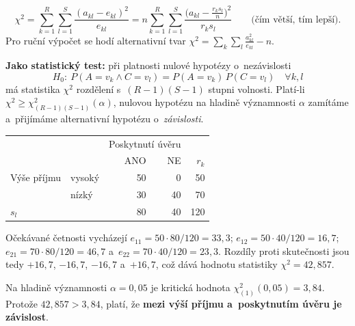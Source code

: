 \documentclass[11pt,a4paper]{article}
\theoremstyle{definition}
\begin{document}
\begin{defbox}
\[ \chi^2=\sum_{k=1}^{R}\sum_{l=1}^{S}\frac{(a_{kl}-e_{kl})^2}{e_{kl}}
   = n\sum_{k=1}^{R}\sum_{l=1}^{S}\frac{\big(a_{kl}-\tfrac{r_ks_l}{n}\big)^2}{r_ks_l}
   \qquad\text{(čím větší, tím lepší).}\]
Pro ruční výpočet se hodí alternativní tvar $\chi^2=\sum_k\sum_l \frac{a_{kl}^2}{e_{kl}}-n$.

\textbf{Jako statistický test:} při platnosti nulové hypotézy o~nezávislosti
\[ H_0:\ P(A=v_k\wedge C=v_l)=P(A=v_k)\,P(C=v_l)\quad \forall k,l \]
má statistika $\chi^2$ rozdělení s~$(R-1)(S-1)$ stupni volnosti. Platí-li
$\chi^2\ge\chi^2_{(R-1)(S-1)}(\alpha)$, nulovou hypotézu na hladině významnosti $\alpha$
zamítáme a~přijímáme alternativní hypotézu o~\emph{závislosti}.
\end{defbox}

\begin{defbox}
\begin{center}
\begin{tabular}{@{}llrrr@{}}
\toprule
& & \multicolumn{2}{c}{Poskytnutí úvěru} & \\
& & ANO & NE & $r_k$ \\
\midrule
Výše příjmu & vysoký & 50 & 0 & 50 \\
            & nízký & 30 & 40 & 70 \\
\midrule
$s_l$ & & 80 & 40 & 120 \\
\bottomrule
\end{tabular}
\end{center}

Očekávané četnosti vycházejí $e_{11}=50\cdot 80/120=33{,}3$; $e_{12}=50\cdot 40/120=16{,}7$;
$e_{21}=70\cdot 80/120=46{,}7$ a~$e_{22}=70\cdot 40/120=23{,}3$. Rozdíly proti skutečnosti
jsou tedy $+16{,}7$, $-16{,}7$, $-16{,}7$ a~$+16{,}7$, což dává hodnotu statistiky
$\chi^2=42{,}857$.

Na hladině významnosti $\alpha=0{,}05$ je kritická hodnota $\chi^2_{(1)}(0{,}05)=3{,}84$.
Protože $42{,}857>3{,}84$, platí, že \textbf{mezi výší příjmu a~poskytnutím úvěru je
závislost}.
\end{defbox}
\end{document}
